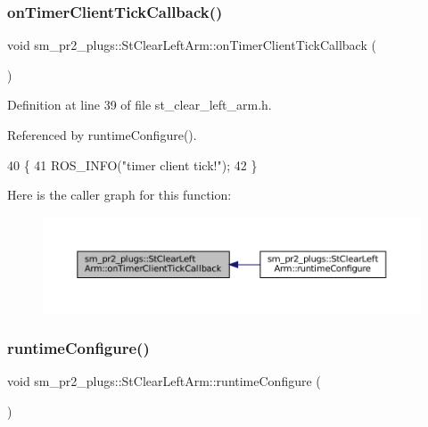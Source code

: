\subsubsection{\texorpdfstring{on\+Timer\+Client\+Tick\+Callback()}{onTimerClientTickCallback()}}
{\footnotesize\ttfamily void sm\+\_\+pr2\+\_\+plugs\+::\+St\+Clear\+Left\+Arm\+::on\+Timer\+Client\+Tick\+Callback (\begin{DoxyParamCaption}{ }\end{DoxyParamCaption})\hspace{0.3cm}{\ttfamily [inline]}}



Definition at line 39 of file st\+\_\+clear\+\_\+left\+\_\+arm.\+h.



Referenced by runtime\+Configure().


\begin{DoxyCode}
40     \{
41         ROS\_INFO(\textcolor{stringliteral}{"timer client tick!"});
42     \}
\end{DoxyCode}
Here is the caller graph for this function\+:
\nopagebreak
\begin{figure}[H]
\begin{center}
\leavevmode
\includegraphics[width=350pt]{structsm__pr2__plugs_1_1StClearLeftArm_acd6c1a301f1b9c7229d42df9fb871a58_icgraph}
\end{center}
\end{figure}
\mbox{\label{structsm__pr2__plugs_1_1StClearLeftArm_a23696f6137f6e29e5144bafea171faaa}} 
\subsubsection{\texorpdfstring{runtime\+Configure()}{runtimeConfigure()}}
{\footnotesize\ttfamily void sm\+\_\+pr2\+\_\+plugs\+::\+St\+Clear\+Left\+Arm\+::runtime\+Configure (\begin{DoxyParamCaption}{ }\end{DoxyParamCaption})\hspace{0.3cm}{\ttfamily [inline]}}



